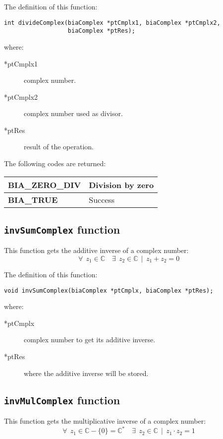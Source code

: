 The definition of this function:
%
\begin{verbatim}
int divideComplex(biaComplex *ptCmplx1, biaComplex *ptCmplx2, 
                  biaComplex *ptRes);
\end{verbatim}
%
where:
%
\begin{description}
\item[*ptCmplx1] complex number.
\item[*ptCmplx2] complex number used as divisor. 
\item[*ptRes] result of the operation.
\end{description}
%
The following codes are returned:
%
\begin{center}
\begin{tabular}{|l|l|}
\hline
\textbf{BIA\_ZERO\_DIV} & Division by zero \\
\hline
\textbf{BIA\_TRUE} & Success \\
\hline
\end{tabular}
\end{center} 

\subsection{\texttt{invSumComplex} function}

This function gets the additive inverse of a complex number:
%
\begin{displaymath}
\forall \ \ z_1 \in \mathbb{C} \quad \exists \ \ z_2 \in \mathbb{C} \ \ | \ \ z_1 + z_2 = 0
\end{displaymath}

The definition of this function:
%
\begin{verbatim}
void invSumComplex(biaComplex *ptCmplx, biaComplex *ptRes);  
\end{verbatim}
%
where:
%
\begin{description}
\item[*ptCmplx] complex number to get its additive inverse.
\item[*ptRes] where the additive inverse will be stored.
\end{description}

\subsection{\texttt{invMulComplex} function}

This function gets the multiplicative inverse of a complex number:
%
\begin{displaymath}
\forall \ \ z_1 \in \mathbb{C} - \{0\} = \mathbb{C}^{*} \quad \exists \ \ z_2 \in \mathbb{C} \ \ | \ \ z_1 \cdot z_2 = 1
\end{displaymath}


